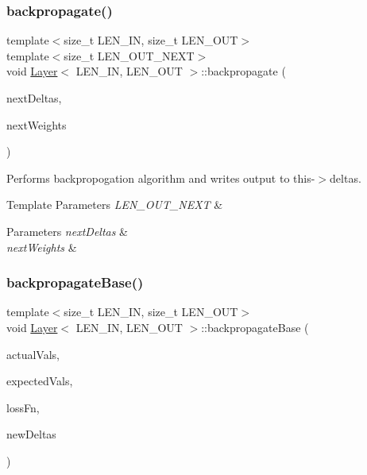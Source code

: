 \subsubsection{\texorpdfstring{backpropagate()}{backpropagate()}\hspace{0.1cm}{\footnotesize\ttfamily [2/2]}}
{\footnotesize\ttfamily template$<$size\+\_\+t L\+E\+N\+\_\+\+IN, size\+\_\+t L\+E\+N\+\_\+\+O\+UT$>$ \\
template$<$size\+\_\+t L\+E\+N\+\_\+\+O\+U\+T\+\_\+\+N\+E\+XT$>$ \\
void \hyperlink{class_layer}{Layer}$<$ L\+E\+N\+\_\+\+IN, L\+E\+N\+\_\+\+O\+UT $>$\+::backpropagate (\begin{DoxyParamCaption}\item[{array$<$ double, L\+E\+N\+\_\+\+IN $>$ $\ast$}]{next\+Deltas,  }\item[{\hyperlink{class_a_f_matrix}{A\+F\+Matrix}$<$ double, L\+E\+N\+\_\+\+O\+U\+T\+\_\+\+N\+E\+XT, L\+E\+N\+\_\+\+IN $>$ $\ast$}]{next\+Weights }\end{DoxyParamCaption})\hspace{0.3cm}{\ttfamily [inline]}}

Performs backpropogation algorithm and writes output to {\ttfamily this-\/$>$deltas}. 
\begin{DoxyTemplParams}{Template Parameters}
{\em L\+E\+N\+\_\+\+O\+U\+T\+\_\+\+N\+E\+XT} & \\
\hline
\end{DoxyTemplParams}

\begin{DoxyParams}{Parameters}
{\em next\+Deltas} & \\
\hline
{\em next\+Weights} & \\
\hline
\end{DoxyParams}
\mbox{\label{class_layer_ac2b3a1c895cc243730809fc3fc68868b}} 
\subsubsection{\texorpdfstring{backpropagate\+Base()}{backpropagateBase()}\hspace{0.1cm}{\footnotesize\ttfamily [1/2]}}
{\footnotesize\ttfamily template$<$size\+\_\+t L\+E\+N\+\_\+\+IN, size\+\_\+t L\+E\+N\+\_\+\+O\+UT$>$ \\
void \hyperlink{class_layer}{Layer}$<$ L\+E\+N\+\_\+\+IN, L\+E\+N\+\_\+\+O\+UT $>$\+::backpropagate\+Base (\begin{DoxyParamCaption}\item[{array$<$ double, L\+E\+N\+\_\+\+O\+UT $>$ $\ast$}]{actual\+Vals,  }\item[{array$<$ double, L\+E\+N\+\_\+\+O\+UT $>$ $\ast$}]{expected\+Vals,  }\item[{\hyperlink{class_a_f_loss_function}{A\+F\+Loss\+Function} $\ast$}]{loss\+Fn,  }\item[{array$<$ double, L\+E\+N\+\_\+\+O\+UT $>$ $\ast$}]{new\+Deltas }\end{DoxyParamCaption})\hspace{0.3cm}{\ttfamily [inline]}}

